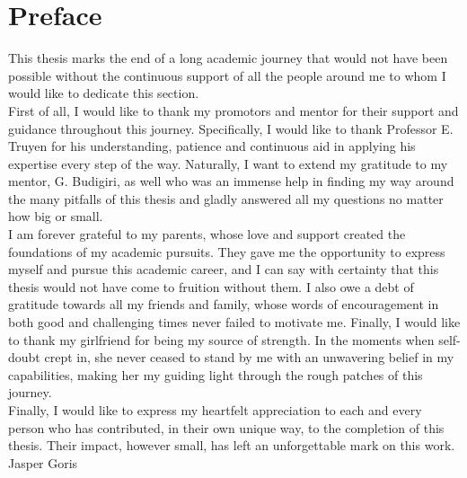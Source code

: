 \chapter{Preface}                                 \label{ch:preface}
This thesis marks the end of a long academic journey that would not have been possible without the continuous support of all the people around me to whom I would like to dedicate this section.
\\[10pt]

First of all, I would like to thank my promotors and mentor for their support and guidance throughout this journey. Specifically, I would like to thank Professor E. Truyen for his understanding, patience and continuous aid in applying his expertise every step of the way. Naturally, I want to extend my gratitude to my mentor, G. Budigiri, as well who was an immense help in finding my way around the many pitfalls of this thesis and gladly answered all my questions no matter how big or small.
\\[10pt]

 I am forever grateful to my parents, whose love and support created the foundations of my academic pursuits. They gave me the opportunity to express myself and pursue this academic career, and I can say with certainty that this thesis would not have come to fruition without them. 
I also owe a debt of gratitude towards all my friends and family, whose words of encouragement in both good and challenging times never failed to motivate me.
Finally, I would like to thank my girlfriend for being my source of strength. In the moments when self-doubt crept in, she never ceased to stand by me with an unwavering belief in my capabilities, making her my guiding light through the rough patches of this journey.
\\[10pt]

Finally, I would like to express my heartfelt appreciation to each and every person who has contributed, in their own unique way, to the completion of this thesis. Their impact, however small, has left an unforgettable mark on this work.
\\[10pt]

Jasper Goris
\cleardoublepage
